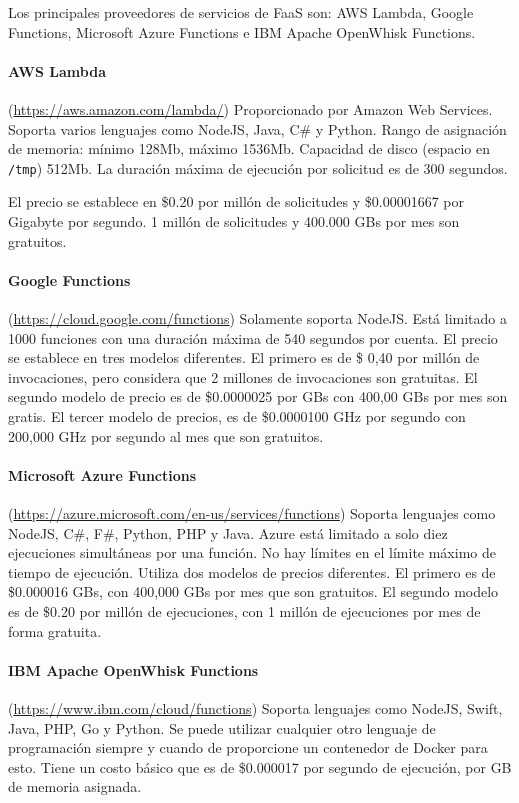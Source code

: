 Los principales proveedores de servicios de FaaS son: AWS Lambda, Google Functions, Microsoft Azure Functions e IBM Apache OpenWhisk Functions\cite{novkovic-nemanja}.

\paragraph{AWS Lambda} (\url{https://aws.amazon.com/lambda/}) Proporcionado por Amazon Web Services. Soporta varios lenguajes como NodeJS, Java, C\# y Python. Rango de asignación de memoria: mínimo 128Mb, máximo 1536Mb. Capacidad de disco (espacio en \texttt{/tmp}) 512Mb. La duración máxima de ejecución por solicitud es de 300 segundos.

El precio se establece en \$0.20 por millón de solicitudes y \$0.00001667 por Gigabyte por segundo. 1 millón de solicitudes y 400.000 GBs por mes son gratuitos.

\paragraph{Google Functions} (\url{https://cloud.google.com/functions}) Solamente soporta NodeJS. Está limitado a 1000 funciones con una duración máxima de 540 segundos por cuenta. 
El precio se establece en tres modelos diferentes. El primero es de \$ 0,40 por millón de invocaciones, pero considera que 2 millones de invocaciones son gratuitas. El segundo modelo de precio es de \$0.0000025 por GBs con 400,00 GBs por mes son gratis. El tercer modelo de precios, es de \$0.0000100 GHz por segundo con 200,000 GHz por segundo al mes que son gratuitos.

\paragraph{Microsoft Azure Functions} (\url{https://azure.microsoft.com/en-us/services/functions}) Soporta lenguajes como NodeJS, C\#, F\#, Python, PHP y Java. Azure está limitado a solo diez ejecuciones simultáneas por una función. No hay límites en el límite máximo de tiempo de ejecución. Utiliza dos modelos de precios diferentes. El primero es de \$0.000016 GBs, con 400,000 GBs por mes que son gratuitos. El segundo modelo es de \$0.20 por millón de ejecuciones, con 1 millón de ejecuciones por mes de forma gratuita.

\paragraph{IBM Apache OpenWhisk Functions} (\url{https://www.ibm.com/cloud/functions}) Soporta lenguajes como NodeJS, Swift, Java, PHP, Go y Python. Se puede utilizar cualquier otro lenguaje de programación siempre y cuando de proporcione un contenedor de Docker para esto. Tiene un costo básico que es de \$0.000017 por segundo de ejecución, por GB de memoria asignada.


